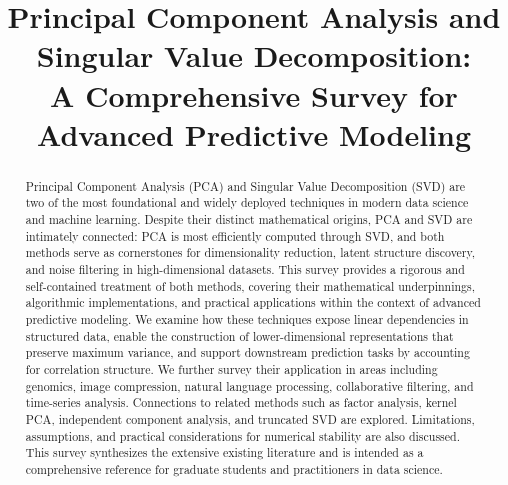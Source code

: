 \documentclass[conference]{IEEEtran}
\begin{document}
\title{Principal Component Analysis and Singular Value Decomposition:\\A Comprehensive Survey for Advanced Predictive Modeling}

\author{
\and
{}
}

\maketitle

\begin{abstract}
Principal Component Analysis (PCA) and Singular Value Decomposition (SVD) are two of the most foundational and widely deployed techniques in modern data science and machine learning. Despite their distinct mathematical origins, PCA and SVD are intimately connected: PCA is most efficiently computed through SVD, and both methods serve as cornerstones for dimensionality reduction, latent structure discovery, and noise filtering in high-dimensional datasets. This survey provides a rigorous and self-contained treatment of both methods, covering their mathematical underpinnings, algorithmic implementations, and practical applications within the context of advanced predictive modeling. We examine how these techniques expose linear dependencies in structured data, enable the construction of lower-dimensional representations that preserve maximum variance, and support downstream prediction tasks by accounting for correlation structure. We further survey their application in areas including genomics, image compression, natural language processing, collaborative filtering, and time-series analysis. Connections to related methods such as factor analysis, kernel PCA, independent component analysis, and truncated SVD are explored. Limitations, assumptions, and practical considerations for numerical stability are also discussed. This survey synthesizes the extensive existing literature and is intended as a comprehensive reference for graduate students and practitioners in data science.
\end{abstract}
\end{document}
